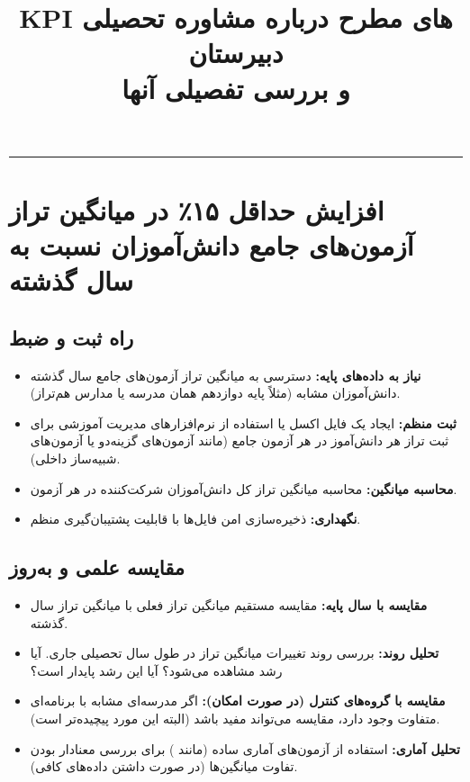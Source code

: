 \documentclass[12pt,a4paper]{article}
\title{KPI های مطرح درباره مشاوره تحصیلی دبیرستان \\
و بررسی تفصیلی آنها}
\author{} %
\date{}    %
\begin{document}
\maketitle
\begin{center}
    \rule{0.8\textwidth}{0.4pt} %
\end{center}
\vspace{1em}



\section{افزایش حداقل ۱۵٪ در میانگین تراز آزمون‌های جامع دانش‌آموزان نسبت به سال گذشته}

\subsection*{راه ثبت و ضبط}
\begin{itemize}
    \item \textbf{نیاز به داده‌های پایه:} دسترسی به میانگین تراز آزمون‌های جامع سال گذشته دانش‌آموزان مشابه (مثلاً پایه دوازدهم همان مدرسه یا مدارس هم‌تراز).
    \item \textbf{ثبت منظم:} ایجاد یک فایل اکسل یا استفاده از نرم‌افزارهای مدیریت آموزشی برای ثبت تراز هر دانش‌آموز در هر آزمون جامع (مانند آزمون‌های گزینه‌دو یا آزمون‌های شبیه‌ساز داخلی).
    \item \textbf{محاسبه میانگین:} محاسبه میانگین تراز کل دانش‌آموزان شرکت‌کننده در هر آزمون.
    \item \textbf{نگهداری:} ذخیره‌سازی امن فایل‌ها با قابلیت پشتیبان‌گیری منظم.
\end{itemize}

\subsection*{مقایسه علمی و به‌روز}
\begin{itemize}
    \item \textbf{مقایسه با سال پایه:} مقایسه مستقیم میانگین تراز فعلی با میانگین تراز سال گذشته.
    \item \textbf{تحلیل روند:} بررسی روند تغییرات میانگین تراز در طول سال تحصیلی جاری. آیا رشد مشاهده می‌شود؟ آیا این رشد پایدار است؟
    \item \textbf{مقایسه با گروه‌های کنترل (در صورت امکان):} اگر مدرسه‌ای مشابه با برنامه‌ای متفاوت وجود دارد، مقایسه می‌تواند مفید باشد (البته این مورد پیچیده‌تر است).
    \item \textbf{تحلیل آماری:} استفاده از آزمون‌های آماری ساده (مانند ) برای بررسی معنادار بودن تفاوت میانگین‌ها (در صورت داشتن داده‌های کافی).
\end{itemize}
\end{document}
